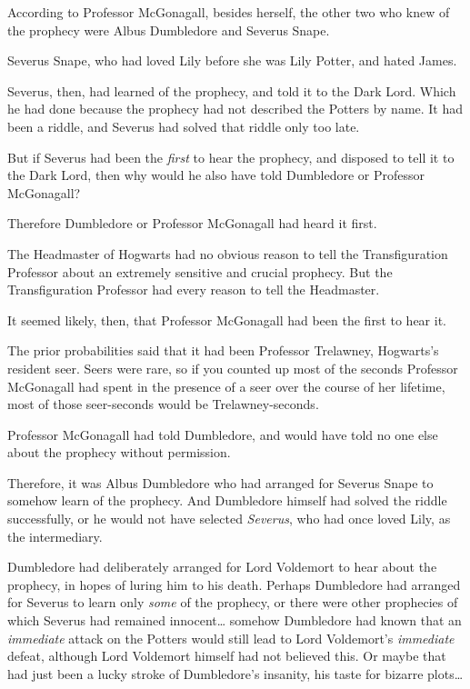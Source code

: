 According to Professor McGonagall, besides herself, the other two who knew of 
the prophecy were Albus Dumbledore and Severus Snape.

Severus Snape, who had loved Lily before she was Lily Potter, and hated James.

Severus, then, had learned of the prophecy, and told it to the Dark Lord. Which 
he had done because the prophecy had not described the Potters by name. It had 
been a riddle, and Severus had solved that riddle only too late.

But if Severus had been the \emph{first} to hear the prophecy, and disposed to 
tell it to the Dark Lord, then why would he also have told Dumbledore or 
Professor McGonagall?

Therefore Dumbledore or Professor McGonagall had heard it first.

The Headmaster of Hogwarts had no obvious reason to tell the Transfiguration 
Professor about an extremely sensitive and crucial prophecy. But the 
Transfiguration Professor had every reason to tell the Headmaster.

It seemed likely, then, that Professor McGonagall had been the first to hear it.

The prior probabilities said that it had been Professor Trelawney, Hogwarts's 
resident seer. Seers were rare, so if you counted up most of the seconds 
Professor McGonagall had spent in the presence of a seer over the course of her 
lifetime, most of those seer-seconds would be Trelawney-seconds.

Professor McGonagall had told Dumbledore, and would have told no one else about 
the prophecy without permission.

Therefore, it was Albus Dumbledore who had arranged for Severus Snape to 
somehow learn of the prophecy. And Dumbledore himself had solved the riddle 
successfully, or he would not have selected \emph{Severus}, who had once loved 
Lily, as the intermediary.

Dumbledore had deliberately arranged for Lord Voldemort to hear about the 
prophecy, in hopes of luring him to his death. Perhaps Dumbledore had arranged 
for Severus to learn only \emph{some} of the prophecy, or there were other 
prophecies of which Severus had remained innocent{\ldots} somehow Dumbledore 
had known that an \emph{immediate} attack on the Potters would still lead to 
Lord Voldemort's \emph{immediate} defeat, although Lord Voldemort himself had 
not believed this. Or maybe that had just been a lucky stroke of Dumbledore's 
insanity, his taste for bizarre plots{\ldots}

